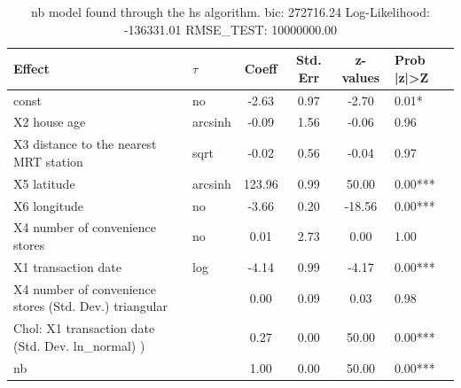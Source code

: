 \begin{table}
	\caption{nb model found through the hs algorithm. bic: 272716.24 Log-Likelihood: -136331.01 RMSE_TEST: 10000000.00}
	\begin{center}
		\begin{tabular}{|l|l|c|c|c|l|}
			\hline
			Effect & $\tau$ & Coeff & Std. Err & z-values & Prob |z|>Z \\
			\hline
			const & no & -2.63 & 0.97 & -2.70 & 0.01* \\
			\hline
			X2 house age & arcsinh & -0.09 & 1.56 & -0.06 & 0.96 \\
			\hline
			X3 distance to the nearest MRT station & sqrt & -0.02 & 0.56 & -0.04 & 0.97 \\
			\hline
			X5 latitude & arcsinh & 123.96 & 0.99 & 50.00 & 0.00*** \\
			\hline
			X6 longitude & no & -3.66 & 0.20 & -18.56 & 0.00*** \\
			\hline
			X4 number of convenience stores & no & 0.01 & 2.73 & 0.00 & 1.00 \\
			\hline
			X1 transaction date & log & -4.14 & 0.99 & -4.17 & 0.00*** \\
			\hline
			X4 number of convenience stores (Std. Dev.) triangular &  & 0.00 & 0.09 & 0.03 & 0.98 \\
			\hline
			 Chol: X1 transaction date (Std. Dev. ln_normal) ) &  & 0.27 & 0.00 & 50.00 & 0.00*** \\
			\hline
			nb &  & 1.00 & 0.00 & 50.00 & 0.00*** \\
			\hline
		\end{tabular}
	\end{center}
\end{table}